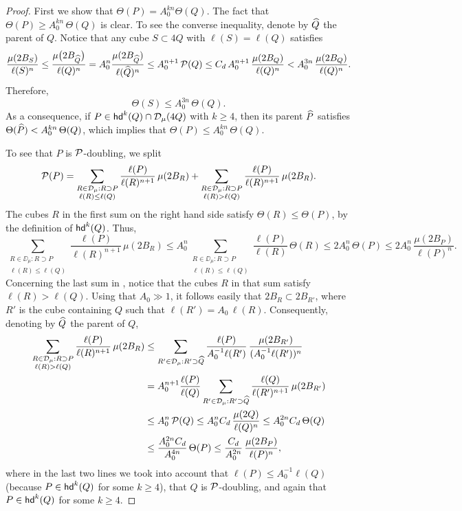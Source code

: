 \begin{proof}
	First we show that $\Theta(P)=A_0^{kn}\Theta(Q)$. 
	The fact that $\Theta(P)\geq A_0^{kn}\,\Theta(Q)$ is clear. To see the converse inequality,
	denote by ${\widehat{Q}}$ the parent of $Q$. Notice that any cube $S\subset 4Q$ with $\ell(S)=\ell(Q)$
	satisfies
	$$\frac{\mu(2B_S)}{\ell(S)^n}\leq \frac{\mu\big(2B_{{\widehat{Q}}}\big)}{\ell(Q)^n} = A_0^{n}\frac{\mu(2B_{{\widehat{Q}}})}{\ell({\widehat{Q}})^n} \leq A_0^{n+1}\,{\mathcal P}(Q) \leq C_d\,A_0^{n+1}\,\frac{\mu(2B_Q)}{\ell(Q)^n} < A_0^{3n}\,\frac{\mu(2B_Q)}{\ell(Q)^n}.$$
	Therefore,
	$$\Theta(S)\leq A_0^{3n}\,\Theta(Q).$$
	As a consequence, if $P\in{\mathsf{hd}}^k(Q)\cap{\mathcal D}_\mu(4Q)$ with $k\geq4$, then its parent ${\widehat{P}}$ satisfies
	$\Theta({\widehat{P}})<A_0^{kn}\,\Theta(Q)$, which implies that $\Theta(P)\leq A_0^{kn}\,\Theta(Q)$.
	
	\vv
	To see that $P$ is ${\mathcal P}$-doubling,
	we split
	\begin{equation}\label{eqvdx1}
		{\mathcal P}(P) =\sum_{\substack{R\in{\mathcal D}_\mu:R\supset P\\ \ell(R)\leq \ell(Q)}} \frac{\ell(P)}{\ell(R)^{n+1}} \,\mu(2B_R)+
		\sum_{\substack{R\in{\mathcal D}_\mu:R\supset P\\ \ell(R)> \ell(Q)}}\frac{\ell(P)}{\ell(R)^{n+1}} \,\mu(2B_R).
	\end{equation}
	The cubes $R$ in the first sum on the right hand side satisfy
	$\Theta(R)\leq \Theta(P)$, by the definition of ${\mathsf{hd}}^k(Q)$. Thus,
	$$\sum_{\substack{R\in\DD_\mu:R\supset P\\ \ell(R)\leq \ell(Q)}} \frac{\ell(P)}{\ell(R)^{n+1}} \,\mu(2B_R)\leq 
	A_0^n 
	\sum_{\substack{R\in\DD_\mu:R\supset P\\ \ell(R)\leq \ell(Q)}}  \frac{\ell(P)}{\ell(R)} \,\Theta(R)\leq 
	2A_0^n\,\Theta(P)\leq 
	2A_0^n\,\frac{\mu(2B_P)}{\ell(P)^n}.$$
	Concerning the last sum in , notice that the cubes $R$ in that sum satisfy $\ell(R)
	>\ell(Q)$.
	Using that $A_0\gg1$, it follows easily that $2B_R\subset 2B_{R'}$, where $R'$ is the cube containing $Q$ such that $\ell(R')=A_0\,\ell(R)$.
	Consequently, denoting by ${\widehat{Q}}$ the parent of $Q$,
	\begin{align*}
		\sum_{\substack{R\in{\mathcal D}_\mu:R\supset P\\ \ell(R)> \ell(Q)}}\frac{\ell(P)}{\ell(R)^{n+1}} \,\mu(2B_R)
		& \leq \sum_{R'\in{\mathcal D}_\mu:R'\supset {\widehat{Q}}} \frac{\ell(P)}{A_0^{-1}\ell(R')} \,\frac{\mu(2B_{R'})}{(A_0^{-1} \ell(R'))^n}\\
		& = A_0^{n+1} \frac{\ell(P)}{\ell(Q)} 
		\sum_{R'\in{\mathcal D}_\mu:R'\supset {\widehat{Q}}} \frac{\ell(Q)}{\ell(R')^{n+1}} \,\mu(2B_{R'})\\
		& \leq A_0^{n}\,{\mathcal P}(Q) \leq A_0^{n}C_d\,\frac{\mu(2Q)}{\ell(Q)^n} \leq  A_0^{2n}C_d\,\Theta(Q)\\
		& 
		\leq \frac{A_0^{2n}C_d}{A_0^{4n}}\,\Theta(P)\leq \frac{C_d}{A_0^{2n}}\,\frac{\mu(2B_P)}{\ell(P)^n},
	\end{align*}
	where in the last two lines we took into account that $\ell(P)\leq A_0^{-1}\ell(Q)$ (because $P\in{\mathsf{hd}}^k(Q)$ for some $k\geq4$), that 
	$Q$ is ${\mathcal P}$-doubling, and again that $P\in{\mathsf{hd}}^k(Q)$ for some $k\geq4$.
	

\end{proof}
